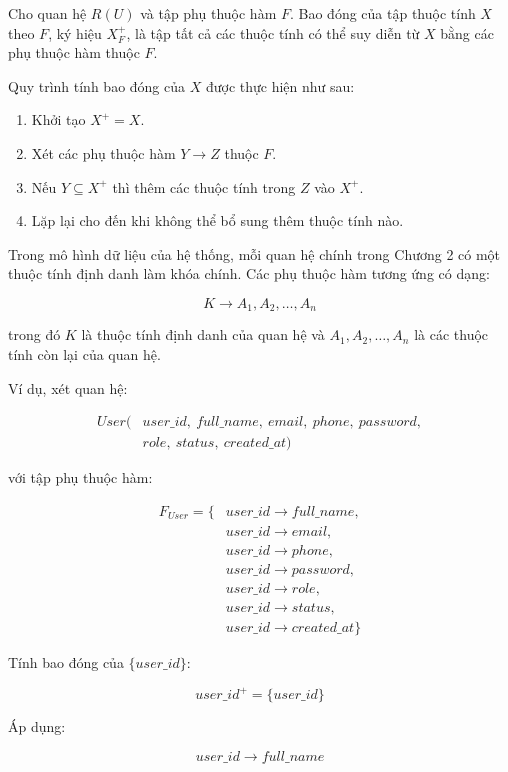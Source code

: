 Cho quan hệ $R(U)$ và tập phụ thuộc hàm $F$. Bao đóng của tập thuộc tính
$X$ theo $F$, ký hiệu $X^+_F$, là tập tất cả các thuộc tính có thể suy diễn
từ $X$ bằng các phụ thuộc hàm thuộc $F$.

Quy trình tính bao đóng của $X$ được thực hiện như sau:

\begin{enumerate}
	\item Khởi tạo $X^+ = X$.
	\item Xét các phụ thuộc hàm $Y \rightarrow Z$ thuộc $F$.
	\item Nếu $Y \subseteq X^+$ thì thêm các thuộc tính trong $Z$ vào $X^+$.
	\item Lặp lại cho đến khi không thể bổ sung thêm thuộc tính nào.
\end{enumerate}

Trong mô hình dữ liệu của hệ thống, mỗi quan hệ chính trong Chương 2 có một
thuộc tính định danh làm khóa chính. Các phụ thuộc hàm tương ứng có dạng:

\[
K \rightarrow A_1,A_2,\ldots,A_n
\]

trong đó $K$ là thuộc tính định danh của quan hệ và
$A_1,A_2,\ldots,A_n$ là các thuộc tính còn lại của quan hệ.

Ví dụ, xét quan hệ:

\[
\begin{aligned}
	User(&user\_id,\ full\_name,\ email,\ phone,\ password,\\
	&role,\ status,\ created\_at)
\end{aligned}
\]

với tập phụ thuộc hàm:

\[
\begin{aligned}
	F_{User}=\{&
	user\_id \rightarrow full\_name,\\
	&user\_id \rightarrow email,\\
	&user\_id \rightarrow phone,\\
	&user\_id \rightarrow password,\\
	&user\_id \rightarrow role,\\
	&user\_id \rightarrow status,\\
	&user\_id \rightarrow created\_at
	\}
\end{aligned}
\]

Tính bao đóng của $\{user\_id\}$:

\[
user\_id^+ = \{user\_id\}
\]

Áp dụng:

\[
user\_id \rightarrow full\_name
\]

